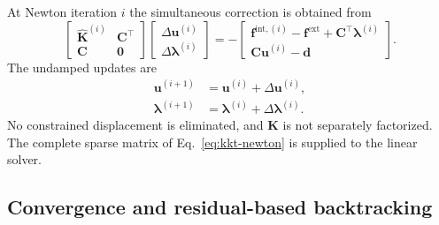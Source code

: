\documentclass[11pt,a4paper]{article}
\newcommand{\vct}[1]{\mathbf{#1}}
\begin{document}
At Newton iteration $i$ the simultaneous correction is obtained from
\begin{equation}
\boxed{
\begin{bmatrix}
\widehat{\vct K}^{(i)} & \vct C^\top\\
\vct C & \vct0
\end{bmatrix}
\begin{bmatrix}
\Delta\vct u^{(i)}\\
\Delta\vct\lambda^{(i)}
\end{bmatrix}
=
-
\begin{bmatrix}
\vct f^{\mathrm{int},(i)}-\vct f^{\mathrm{ext}}+\vct C^\top\vct\lambda^{(i)}\\
\vct C\vct u^{(i)}-\vct d
\end{bmatrix}.
}
\label{eq:kkt-newton}
\end{equation}
The undamped updates are
\begin{align}
\vct u^{(i+1)}&=\vct u^{(i)}+\Delta\vct u^{(i)},\\
\vct\lambda^{(i+1)}&=\vct\lambda^{(i)}+\Delta\vct\lambda^{(i)}.
\end{align}
No constrained displacement is eliminated, and $\vct K$ is not separately factorized. The complete sparse matrix of Eq.~\eqref{eq:kkt-newton} is supplied to the linear solver.

\subsection{Convergence and residual-based backtracking}
\label{sec:global-convergence-backtracking}
\end{document}
